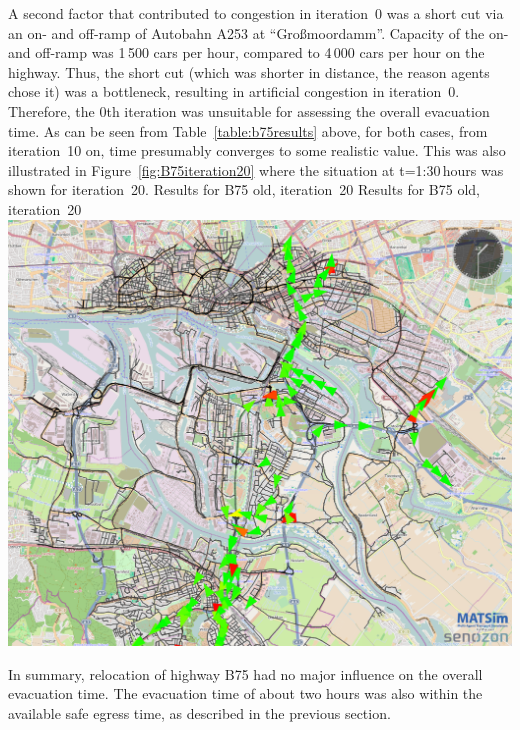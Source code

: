 {}
%
A second factor that contributed to congestion in iteration~0 was a short cut via an on- and off-ramp of Autobahn A253 at ``Gro{\ss}moordamm''. Capacity of the on- and off-ramp was 1\,500 cars per hour, compared to 4\,000 cars per hour on the highway. Thus, the short cut (which was shorter in distance, the reason agents chose it) was a bottleneck, resulting in artificial congestion in iteration~0.
Therefore, the 0th iteration was unsuitable for assessing the overall evacuation time. As can be seen from Table~\ref{table:b75results} above, for both cases, from iteration~10 on, time presumably converges to some realistic value. This was also illustrated in Figure~\ref{fig:B75iteration20} where the situation at t=1:30\,hours was shown for iteration~20.
%
\createfigure%
{Results for B75 old, iteration~20}%
{Results for B75 old, iteration~20}%
{\label{fig:B75iteration20}}%
{\includegraphics[width=0.7\linewidth]{scenarios/figures/B75iteration20}}%
{}

In summary, relocation of highway B75 had no major influence on the overall evacuation time. The evacuation time of about two hours was also within the available safe egress time, as described in the previous section. 

